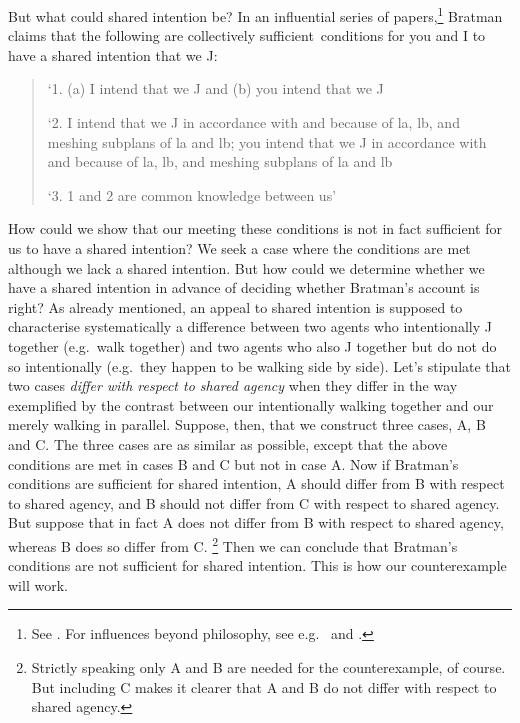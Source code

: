 \documentclass[12pt,\papersize]{extarticle}
\begin{document}
But what could shared intention be?
In an influential series of papers,\footnote{ 
See \citet{Bratman:1992mi,Bratman:1993je,Bratman:1999fr,Bratman:2009lv}.
For influences beyond philosophy, see e.g.\ \citet{Tomasello:2005wx} and \citet{Knoblich:2008hy}. 
}
Bratman claims that the following are collectively sufficient\footnotemark \ conditions for you and I to have a shared intention that we J:
%
%
\begin{quote}
\label{quote:bratman_account}
`1. (a) I intend that we J and (b) you intend that we J
 
`2. I intend that we J in accordance with and because of la, lb, and meshing subplans of la and lb; you intend that we J in accordance with and because of la, lb, and meshing subplans of la and lb
 
`3. 1 and 2 are common knowledge between us' \citep[][p.\ View 4]{Bratman:1993je}
\end{quote}
%
How could we show that our meeting these conditions is not in fact sufficient for us to have a shared intention? 
We seek a case where the conditions are met although we lack a shared intention.
But how could we determine whether we have a shared intention in advance of deciding whether Bratman's account is right?
As already mentioned, an appeal to shared intention is supposed to  characterise systematically a difference between two agents who intentionally J together (e.g.\ walk  together) and two agents who also  J together but do not do so intentionally (e.g.\ they happen to be walking side by side). 
Let's stipulate that two cases \emph{differ with respect to shared agency} when they differ in the way exemplified by the contrast between our intentionally walking together and our merely walking in parallel.
Suppose, then, that we construct three cases, A, B and C.
The three cases are as similar as possible, except that the above conditions are met in cases B and C but not in case A.
Now if Bratman's conditions are sufficient for shared intention, A should differ from B with respect to shared agency, and B should not differ from C with respect to shared agency.
But suppose that in fact A does not differ from B with respect to shared agency, whereas B does so differ from C.%
\footnote{
Strictly speaking only A and B are needed for the counterexample, of course.
But including C makes it clearer that A and B do not differ with respect to shared agency.
}
Then we can conclude that Bratman's conditions are not sufficient for shared intention.
This is how our counterexample will work.
\end{document}
